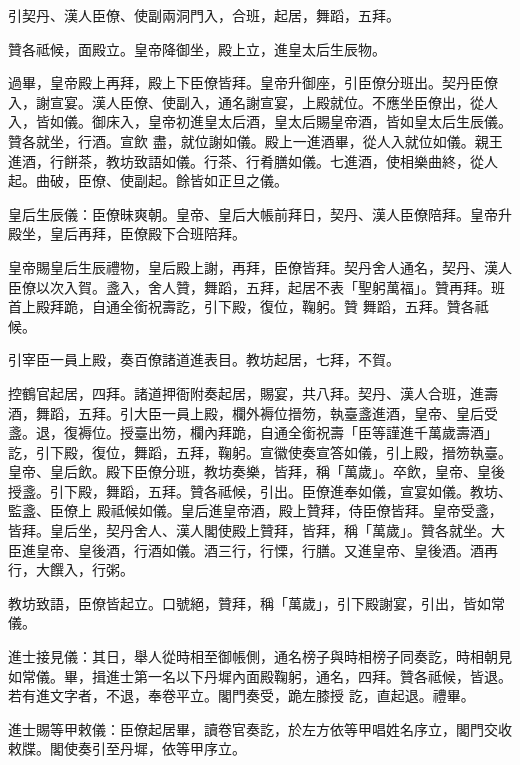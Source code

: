 \begin{pinyinscope}
 引契丹、漢人臣僚、使副兩洞門入，合班，起居，舞蹈，五拜。



 贊各祗候，面殿立。皇帝降御坐，殿上立，進皇太后生辰物。



 過畢，皇帝殿上再拜，殿上下臣僚皆拜。皇帝升御座，引臣僚分班出。契丹臣僚入，謝宣宴。漢人臣僚、使副入，通名謝宣宴，上殿就位。不應坐臣僚出，從人入，皆如儀。御床入，皇帝初進皇太后酒，皇太后賜皇帝酒，皆如皇太后生辰儀。贊各就坐，行酒。宣飲
 盡，就位謝如儀。殿上一進酒畢，從人入就位如儀。親王進酒，行餅茶，教坊致語如儀。行茶、行肴膳如儀。七進酒，使相樂曲終，從人起。曲破，臣僚、使副起。餘皆如正旦之儀。



 皇后生辰儀：臣僚昧爽朝。皇帝、皇后大帳前拜日，契丹、漢人臣僚陪拜。皇帝升殿坐，皇后再拜，臣僚殿下合班陪拜。



 皇帝賜皇后生辰禮物，皇后殿上謝，再拜，臣僚皆拜。契丹舍人通名，契丹、漢人臣僚以次入賀。盞入，舍人贊，舞蹈，五拜，起居不表「聖躬萬福」。贊再拜。班首上殿拜跪，自通全銜祝壽訖，引下殿，復位，鞠躬。贊
 舞蹈，五拜。贊各祗候。



 引宰臣一員上殿，奏百僚諸道進表目。教坊起居，七拜，不賀。



 控鶴官起居，四拜。諸道押衙附奏起居，賜宴，共八拜。契丹、漢人合班，進壽酒，舞蹈，五拜。引大臣一員上殿，欄外褥位搢笏，執臺盞進酒，皇帝、皇后受盞。退，復褥位。授臺出笏，欄內拜跪，自通全銜祝壽「臣等謹進千萬歲壽酒」訖，引下殿，復位，舞蹈，五拜，鞠躬。宣徽使奏宣答如儀，引上殿，搢笏執臺。皇帝、皇后飲。殿下臣僚分班，教坊奏樂，皆拜，稱「萬歲」。卒飲，皇帝、皇後授盞。引下殿，舞蹈，五拜。贊各祗候，引出。臣僚進奉如儀，宣宴如儀。教坊、監盞、臣僚上
 殿祗候如儀。皇后進皇帝酒，殿上贊拜，侍臣僚皆拜。皇帝受盞，皆拜。皇后坐，契丹舍人、漢人閣使殿上贊拜，皆拜，稱「萬歲」。贊各就坐。大臣進皇帝、皇後酒，行酒如儀。酒三行，行慄，行膳。又進皇帝、皇後酒。酒再行，大饌入，行粥。



 教坊致語，臣僚皆起立。口號絕，贊拜，稱「萬歲」，引下殿謝宴，引出，皆如常儀。



 進士接見儀：其日，舉人從時相至御帳側，通名榜子與時相榜子同奏訖，時相朝見如常儀。畢，揖進士第一名以下丹墀內面殿鞠躬，通名，四拜。贊各祗候，皆退。若有進文字者，不退，奉卷平立。閣門奏受，跪左膝授
 訖，直起退。禮畢。



 進士賜等甲敕儀：臣僚起居畢，讀卷官奏訖，於左方依等甲唱姓名序立，閣門交收敕牒。閣使奏引至丹墀，依等甲序立。




\end{pinyinscope}
